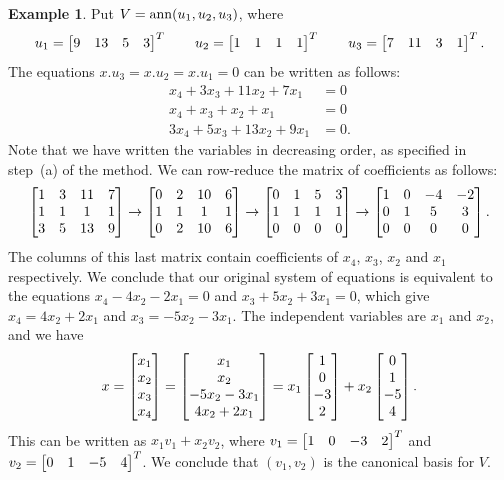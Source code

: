 \documentclass[reqno]{amsart}
\theoremstyle{definition}
\newtheorem{example}[theorem]{Example}
\begin{document}
\begin{example}\label{eg-ann-basis-i}
 Put $V=\operatorname{ann}(u_1,u_2,u_3)$, where
 \[  u_1 = \left[\begin{matrix} 9& 13&5&3\end{matrix}\right]^T \qquad
     u_2 = \left[\begin{matrix} 1&1&1&1\end{matrix}\right]^T \qquad
     u_3 = \left[\begin{matrix} 7&11&3&1\end{matrix}\right]^T.
 \]
 The equations $x.u_3=x.u_2=x.u_1=0$ can be written as follows:
 \begin{align*}
  x_4 + 3x_3 + 11x_2 + 7x_1 &= 0 \\
  x_4 + x_3 + x_2 + x_1 &= 0 \\
  3x_4+5x_3+13x_2+9x_1 &= 0.
 \end{align*}
 Note that we have written the variables in decreasing order, as
 specified in step~(a) of the method.  We can row-reduce the matrix of
 coefficients as follows:
 \[ \left[\begin{matrix} 1&3&11&7 \\ 1&1&1&1 \\ 3&5&13&9 \end{matrix}\right]
    \to
    \left[\begin{matrix} 0&2&10&6 \\ 1&1&1&1 \\ 0&2&10&6 \end{matrix}\right]
    \to
    \left[\begin{matrix} 0&1&5&3 \\ 1&1&1&1 \\ 0&0&0&0 \end{matrix}\right]
    \to
    \left[\begin{matrix} 1&0&-4&-2 \\ 0&1&5&3 \\ 0&0&0&0 \end{matrix}\right].
 \]
 The columns of this last matrix contain coefficients of $x_4$,
 $x_3$, $x_2$ and $x_1$ respectively.  We conclude that our original
 system of equations is equivalent to the equations $x_4-4x_2-2x_1=0$ and
 $x_3+5x_2+3x_1=0$, which give $x_4=4x_2+2x_1$ and
 $x_3=-5x_2-3x_1$.  The independent variables are $x_1$ and $x_2$, and
 we have
 \[ x = \left[\begin{matrix} x_1\\x_2\\x_3\\x_4 \end{matrix}\right]
      = \left[\begin{matrix} x_1\\x_2\\-5x_2-3x_1\\ 4x_2+2x_1\end{matrix}\right]
      = x_1\left[\begin{matrix} 1\\0\\-3\\2\end{matrix}\right] +
        x_2\left[\begin{matrix} 0\\1\\-5\\4\end{matrix}\right].
 \]
 This can be written as $x_1v_1+x_2v_2$, where $v_1=\left[\begin{matrix} 1&0&-3&2\end{matrix}\right]^T$
 and $v_2=\left[\begin{matrix} 0&1&-5&4\end{matrix}\right]^T$.  We conclude that $(v_1,v_2)$ is the
 canonical basis for $V$.
\end{example}
\end{document}

